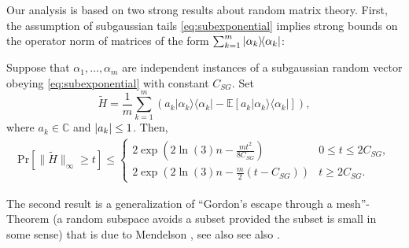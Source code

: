 Our analysis is based on two strong results about random matrix theory. First, the assumption of subgaussian tails \eqref{eq:subexponential} implies strong bounds on the operator norm of matrices of the form $\sum_{k=1}^m \ket{{\alpha_k}}\bra{\alpha_k}$:

\begin{theorem} \label{thm:bernstein}
Suppose that $\alpha_1,\ldots,\alpha_m$ are independent instances of a subgaussian random vector obeying \eqref{eq:subexponential} with constant $C_{SG}$.
Set
\begin{equation}
  \tilde{ H} = \frac{1}{m} \sum_{k=1}^m \left( a_k |\alpha_k \rangle \! \langle \alpha_k| - \mathbb{E} \left[ a_k |\alpha_k \rangle \! \langle \alpha_k| \right] \right),
  \label{eq:Htilde}
\end{equation}
where $a_k \in \mathbb{C}$ and ${\vert a_k\vert} \leq 1$.
Then,
\begin{align*}
\mathrm{Pr} \left[ \| \tilde{ H} \|_\infty \geq t \right]
\leq
\begin{cases}
2 \exp \left( 2 \ln (3) n  - \frac{mt^2}{8 C_{SG}} \right) & 0 \leq t \leq 2C_{SG}, \\
2 \exp \left( 2 \ln (3) n - \frac{m}{2} (t- C_{SG} )  \right) & t \geq 2 C_{SG}.
\end{cases}
\end{align*}
\end{theorem}


The second result is a generalization of ``Gordon's escape through a mesh''-Theorem \cite{gordon_milman_1988} (a random subspace avoids a subset provided the subset is small in some sense) that is due to Mendelson \cite{mendelson_learning_2015,koltchinskii_bounding_2015}, see also see also \cite{tropp_convex_2015}.

